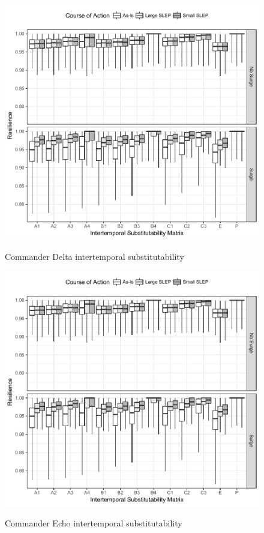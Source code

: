 \documentclass[preprint,12pt]{elsarticle}
\begin{document}
\begin{figure}[h]
  \begin{center}
    \includegraphics[width=5in]{CDR_Delta_GradRes}
  \end{center}
\begin{quote}
  \caption{Commander Delta intertemporal substitutability
  \label{f:CDR_D_Grad}}
\end{quote}
\end{figure}

\begin{figure}[h]
  \begin{center}
    \includegraphics[width=5in]{CDR_Echo_GradRes}
  \end{center}
\begin{quote}
  \caption{Commander Echo intertemporal substitutability
  \label{f:CDR_E_Grad}}
\end{quote}
\end{figure}
\end{document}

